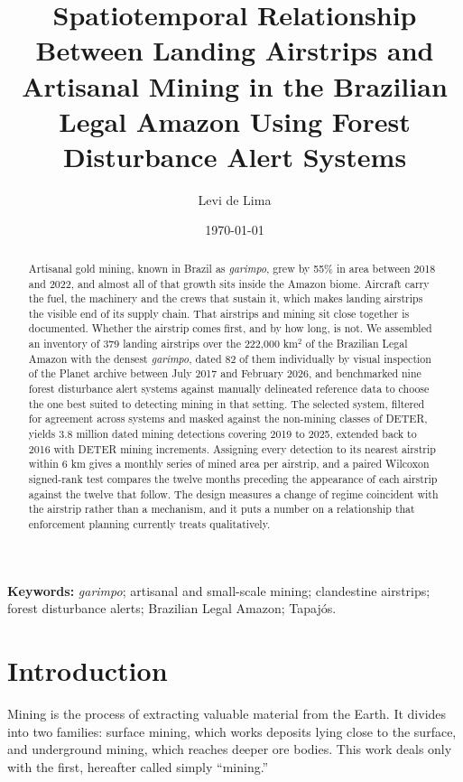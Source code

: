 \documentclass[11pt]{article}
\title{Spatiotemporal Relationship Between Landing Airstrips and Artisanal Mining in the Brazilian Legal Amazon Using Forest Disturbance Alert Systems}
\author{Levi de Lima}
\date{\today}
\begin{document}
\maketitle

\begin{abstract}
Artisanal gold mining, known in Brazil as \textit{garimpo}, grew by 55\% in area between 2018 and 2022, and almost all of that growth sits inside the Amazon biome. Aircraft carry the fuel, the machinery and the crews that sustain it, which makes landing airstrips the visible end of its supply chain. That airstrips and mining sit close together is documented. Whether the airstrip comes first, and by how long, is not. We assembled an inventory of 379 landing airstrips over the 222{,}000 km$^2$ of the Brazilian Legal Amazon with the densest \textit{garimpo}, dated 82 of them individually by visual inspection of the Planet archive between July 2017 and February 2026, and benchmarked nine forest disturbance alert systems against manually delineated reference data to choose the one best suited to detecting mining in that setting. The selected system, filtered for agreement across systems and masked against the non-mining classes of DETER, yields 3.8 million dated mining detections covering 2019 to 2025, extended back to 2016 with DETER mining increments. Assigning every detection to its nearest airstrip within 6 km gives a monthly series of mined area per airstrip, and a paired Wilcoxon signed-rank test compares the twelve months preceding the appearance of each airstrip against the twelve that follow.
The design measures a change of regime coincident with the airstrip rather than a mechanism, and it puts a number on a relationship that enforcement planning currently treats qualitatively.
\end{abstract}

\textbf{Keywords:} \textit{garimpo}; artisanal and small-scale mining; clandestine airstrips; forest disturbance alerts; Brazilian Legal Amazon; Tapaj\'os.

\section{Introduction}

Mining is the process of extracting valuable material from the Earth. It divides into two families: surface mining, which works deposits lying close to the surface, and underground mining, which reaches deeper ore bodies. This work deals only with the first, hereafter called simply ``mining.''
\end{document}
